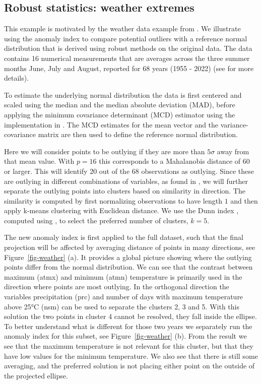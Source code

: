\documentclass[
  12pt]{article}
\begin{document}
\subsection{Robust statistics: weather
extremes}\label{robust-statistics-weather-extremes}

This example is motivated by the weather data example from
\citet{filzmoser2018}. We illustrate using the anomaly index to compare
potential outliers with a reference normal distribution that is derived
using robust methods on the original data. The data contains 16
numerical measurements that are averages across the three summer months
June, July and August, reported for 68 years (1955 - 2022) (see
\citet{filzmoser2018} for more details).

To estimate the underlying normal distribution the data is first
centered and scaled using the median and the median absolute deviation
(MAD), before applying the minimum covariance determinant (MCD)
estimator \citep{rousseeuw1985multivariate} using the implementation in
\citet{robustbase}. The MCD estimates for the mean vector and the
variance-covariance matrix are then used to define the reference normal
distribution.

Here we will consider points to be outlying if they are more than
\(5 \sigma\) away from that mean value. With \(p=16\) this corresponds
to a Mahalanobis distance of \(60\) or larger. This will identify \(20\)
out of the \(68\) observations as outlying. Since these are outlying in
different combinations of variables, as found in \citet{filzmoser2018},
we will further separate the outlying points into clusters based on
similarity in direction. The similarity is computed by first normalizing
observations to have length \(1\) and then apply k-means clustering with
Euclidean distance. We use the Dunn index \citet{dunn}, computed using
\citet{fpc}, to select the preferred number of clusters, \(k=5\).

The new anomaly index is first applied to the full dataset, such that
the final projection will be affected by averaging distance of points in
many directions, see Figure~\ref{fig-weather} (a). It provides a global
picture showing where the outlying points differ from the normal
distribution. We can see that the contrast between maximum (atmx) and
minimum (atmn) temperature is primarily used in the direction where
points are most outlying. In the orthogonal direction the variables
precipitation (prc) and number of days with maximum temperature above
25°C (nsm) can be used to separate the clusters 2, 3 and 5. With this
solution the two points in cluster 4 cannot be resolved, they fall
inside the ellipse. To better understand what is different for those two
years we separately run the anomaly index for this subset, see
Figure~\ref{fig-weather} (b). From the result we see that the maximum
temperature is not relevant for this cluster, but that they have low
values for the minimum temperature. We also see that there is still some
averaging, and the preferred solution is not placing either point on the
outside of the projected ellipse.
\end{document}
